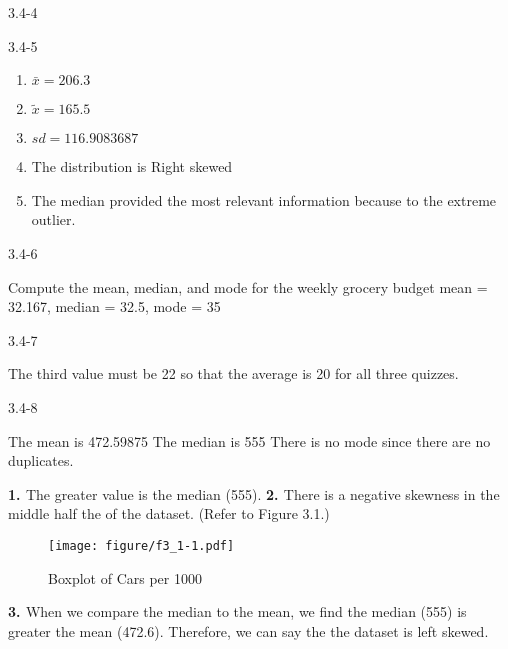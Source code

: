 \begin{exsol@solution}{3.4-4}


\end{exsol@solution}
\begin{exsol@solution}{3.4-5}

\begin{enumerate}
\item $\bar{x} = 206.3$
\item $\tilde{x} = 165.5$
\item $sd = 116.9083687 $
\item The distribution is Right skewed
\item The median provided the most relevant information because to the extreme outlier.
\end{enumerate}

\end{exsol@solution}
\begin{exsol@solution}{3.4-6}
	
	Compute the mean, median, and mode for the weekly grocery budget
	mean = 32.167, median = 32.5, mode = 35
	
\end{exsol@solution}
\begin{exsol@solution}{3.4-7}
	
	The third value must be 22 so that the average is 20 for all three quizzes.
	
\end{exsol@solution}
\begin{exsol@solution}{3.4-8}




    The mean is 472.59875
    The median is 555
    There is no mode since there are no duplicates.

{\bf{1. }} The greater value is the median (555).  {\bf{2. }} There is a negative skewness in the middle half the of the dataset.  (Refer to Figure 3.1.)

\begin{figure}[htbp] %
   \centering
   \texttt{[image: figure/f3\_1-1.pdf]}
   \caption{Boxplot of Cars per 1000}
   \label{fig:f3_1}
\end{figure}

{\bf{3. }} When we compare the median to the mean, we find the median (555) is greater the mean (472.6).  Therefore, we can say the the dataset is left skewed.

\end{exsol@solution}
